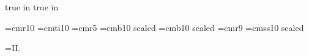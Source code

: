  true in
 true in


\font\dotless=cmr10 %
\font\itdotless=cmti10
\def\itumi{{\"{\itdotless\char'020}}}
\def\itumj{{\"{\itdotless\char'021}}}
\def\umi{{\"{\dotless\char'020}}}
\def\umj{{\"{\dotless\char'021}}}
\font\smaller=cmr5
\font\boldtitlefont=cmb10 scaled
\font\smallboldtitle=cmb10 scaled 
\font\ninerm=cmr9
\font\sans=cmss10 scaled

\footline={\hfil {\tenrm II.\folio}\hfil}

\def\eps{{\varepsilon}}
\def\Eps{{\epsilon}}
\def\kap{{\kappa}}
\def\lam{{\lambda}}
\def\Lam{{\Lambda}}

\def\undertext#1{$\underline{\vphantom{y}\hbox{#1}}$}
\def\nspace{\lineskip=1pt\baselineskip=12pt%
     \lineskiplimit=0pt}
\def\dspace{\lineskip=2pt\baselineskip=18pt%
     \lineskiplimit=0pt}

\def\w{{\mathchoice{\,{\scriptstyle\wedge}\,}
  {{\scriptstyle\wedge}}
  {{\scriptscriptstyle\wedge}}{{\scriptscriptstyle\wedge}}}}
\def\Le{{\mathchoice{\,{\scriptstyle\le}\,}
{\,{\scriptstyle\le}\,}
{\,{\scriptscriptstyle\le}\,}{\,{\scriptscriptstyle\le}\,}}}
\def\Ge{{\mathchoice{\,{\scriptstyle\ge}\,}
{\,{\scriptstyle\ge}\,}
{\,{\scriptscriptstyle\ge}\,}{\,{\scriptscriptstyle\ge}\,}}}
\def\plus{{\hbox{$\scriptscriptstyle +$}}}
\def\xdot{\dot{x}}
\def\Item#1{\par%
     \smallskip\hang\indent\llap{\hbox to\parindent
     {#1\hfill\enspace}}\ignorespaces}
\def\Condition#1{\item{#1}}
\def\Firstcondition#1{\hangindent\parindent{#1}\enspace
     \ignorespaces}
\def\Proclaim#1{\medbreak
  \medskip\noindent{\bf#1\enspace}\it\ignorespaces}
\def\finishproclaim{\par\rm
     \ifdim\lastskip<\medskipamount\removelastskip
     \penalty55\medskip\fi}

\def\im{{\rm Im}}      \def\Open{{\rm open}}
\def\Diff{{\rm Diff}}  \def\Closed{{\rm closed}}
\def\Map{{\rm Diff}}   \def\spurious{{\rm spurious}}
\def\Met{{\rm Met}}    \def\phys{{\rm phys}}
\def\diag{{\rm diag}}  \def\Vir{{\rm Vir}}
\def\spin{{\rm spin}}  \def\Res{{\rm Res}}
\def\Null{{\rm null}}  \def\mass{{\rm mass}}
\def\SO{{\rm SO}}      \def\Tr{\hbox{\rm Tr}}
\def\SU{{\rm SU}}      \def\tr{{\rm tr}}
\def\Sp{{\rm Sp}}

